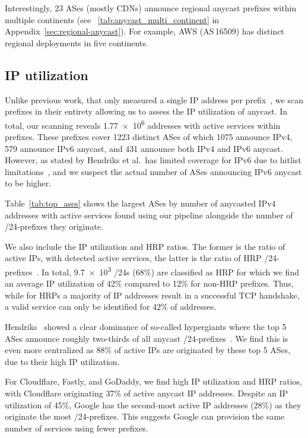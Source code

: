 %
Interestingly, \num{23} ASes (mostly CDNs) announce regional anycast prefixes within multiple continents (see ~\cref{tab:anycast_multi_continent} in Appendix~\ref{sec:regional-anycast}).
For example, AWS (AS\,16509) has distinct regional deployments in five continents.

\subsection{IP utilization}\label{subsec:hypergiant-dominance}

Unlike previous work,
that only measured a single IP address per prefix~\cite{CicaleseEtAl_CharacterizingIPv4Anycast_2015},
we scan prefixes in their entirety
allowing us to assess the IP utilization of anycast.
In total, our scanning reveals
\num{1.77e6}
addresses with active services within \laces prefixes.
%
These prefixes cover \num{1223} distinct ASes of which
\num{1075} announce IPv4, \num{579} announce IPv6 anycast,
and \num{431} announce both IPv4 and IPv6 anycast.
%
However, as stated by Hendriks et al.~\laces has limited coverage for IPv6 due to hitlist limitations~\cite{Hendriks_LACeS_An_Open_2025},
and we suspect the actual number of ASes announcing IPv6 anycast to be higher.



Table~\ref{tab:top_ases} shows the largest ASes by number of anycasted IPv4 addresses with active services found using our pipeline
alongside the number of /24-prefixes they originate.

We also include the IP utilization and HRP ratios.
The former is the ratio of active IPs, \ie with detected active services,
the latter is the ratio of HRP /24-prefixes~\cite{SattlerEtAl_PackedBrimInvestigating_2023}.
%
In total, \num{9.7e3} /24s (68\%) are classified as HRP
for which we find an average IP utilization of 42\%
compared to 12\% for non-HRP prefixes.
Thus, while for HRPs a majority of IP addresses result in a successful TCP handshake,
a valid service can only be identified for 42\% of addresses.

Hendriks \etal~showed a clear dominance of so-called hypergiants
where the top 5 ASes announce roughly two-thirds of all anycast /24-prefixes~\cite{Hendriks_LACeS_An_Open_2025}.
We find this is even more centralized as 88\% of active IPs are originated by these top 5 ASes,
due to their high IP utilization.

For Cloudflare, Fastly, and GoDaddy, we find high IP utilization and HRP ratios,
with Cloudflare originating 37\% of active anycast IP addresses.
%
Despite an IP utilization of 45\%, Google has the second-most active IP addresses (28\%) as they originate the most /24-prefixes.
%
This suggests Google can provision the same number of services using fewer prefixes.

